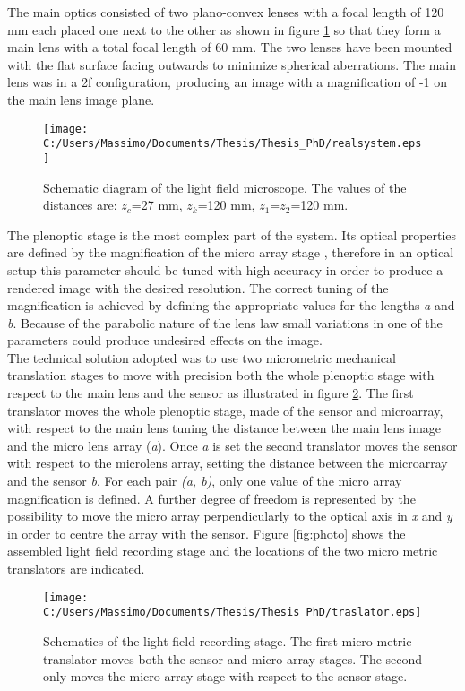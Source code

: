 The main optics consisted of two plano-convex lenses with a focal length of 120 mm each placed one next to the other as shown in figure \ref{fig:realsys} so that they form a main lens with a total focal length of 60 mm. The two lenses have been mounted with the flat surface facing outwards to minimize spherical aberrations. The main lens was in a 2f configuration, producing an image with a magnification of -1 on the main lens image plane. 
\newpage
\begin{figure}[H]
	\centering
	\texttt{[image: C:/Users/Massimo/Documents/Thesis/Thesis\_PhD/realsystem.eps]}
	\caption{\label{fig:realsys} Schematic diagram of the light field microscope. The values of the distances are: $z_c$=27 mm, $z_k$=120 mm, $z_1$=$z_2$=120 mm.
 }
\end{figure}
The plenoptic stage is the most complex part of the system. Its optical properties are defined by the magnification of the micro array stage \cite{turola2014wave,georgiev2010focused}, therefore in an optical setup this parameter should be tuned with high accuracy in order to produce a rendered image with the desired resolution. The correct tuning of the magnification is achieved by defining the appropriate values for the lengths \textit{a} and \textit{b}. Because of the parabolic nature of the lens law small variations in one of the parameters could produce undesired effects on the image.\\
The technical solution adopted was to use two micrometric mechanical translation stages to move with precision both the whole plenoptic stage with respect to the main lens and the sensor as illustrated in figure \ref{fig:traslator}. The first translator moves the whole plenoptic stage, made of the sensor and microarray, with respect to the main lens tuning the distance between the main lens image and the micro lens array (\textit{a}). Once \textit{a} is set the second translator moves the sensor with respect to the microlens array, setting the distance between the microarray and the sensor \textit{b}. For each pair \textit{(a, b)}, only one value of the micro array magnification is defined. A further degree of freedom is represented by the possibility to move the micro array perpendicularly to the optical axis in \textit{x} and \textit{y} in order to centre the array with the sensor.
Figure \ref{fig:photo} shows the assembled light field recording stage and the locations of the two micro metric translators are indicated.
\begin{figure}[H]
	\centering
	\texttt{[image: C:/Users/Massimo/Documents/Thesis/Thesis\_PhD/traslator.eps]}
	\caption{\label{fig:traslator} Schematics of the light field recording stage. The first micro metric translator moves both the sensor and micro array stages. The second only moves the micro array stage with respect to the sensor stage. }
\end{figure}
